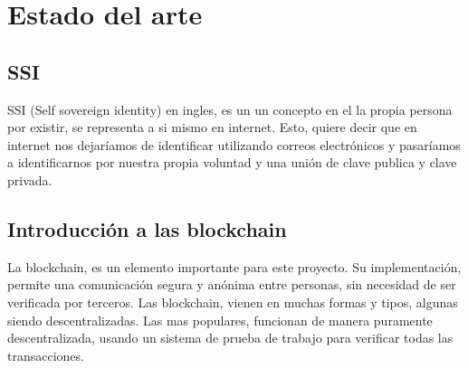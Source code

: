 \chapter{Estado del arte}\label{EdA}

\thispagestyle{fancy}


\section*{SSI}
SSI (Self sovereign identity) en ingles, es un un concepto en el la propia persona por existir, se representa a si mismo en internet. Esto, quiere decir que en internet nos dejaríamos de identificar utilizando correos electrónicos y pasaríamos a identificarnos por nuestra propia voluntad y una unión de clave publica y clave privada.

\section*{Introducción a las blockchain}
La blockchain, es un elemento importante para este proyecto. Su implementación, permite una comunicación segura y anónima entre personas, sin necesidad de ser verificada por terceros. Las blockchain, vienen en muchas formas y tipos, algunas siendo descentralizadas. Las mas populares, funcionan de manera puramente descentralizada, usando un sistema de prueba de trabajo para verificar todas las transacciones.

\newpage
\thispagestyle{empty}